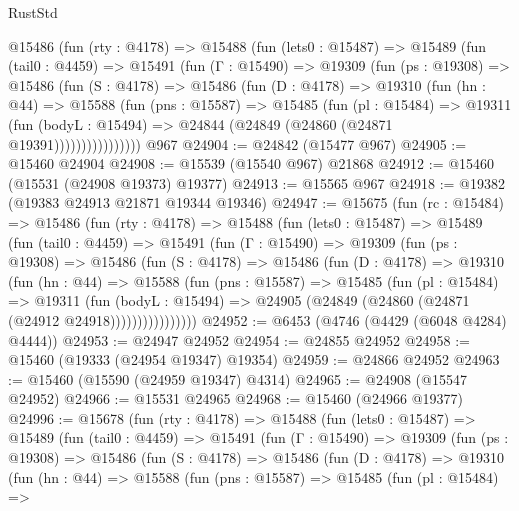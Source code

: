 \begin{lexlean}{RustStd}
\begin{coremodule}
      @15486
        (fun (rty : @4178) =>
        @15488
          (fun (lets0 : @15487) =>
          @15489
            (fun (tail0 : @4459) =>
            @15491
              (fun (Γ : @15490) =>
              @19309
                (fun (ps : @19308) =>
                @15486
                  (fun (S : @4178) =>
                  @15486
                    (fun (D : @4178) =>
                    @19310
                      (fun (hn : @44) =>
                      @15588
                        (fun (pns : @15587) =>
                        @15485
                          (fun (pl : @15484) =>
                          @19311
                            (fun (bodyL : @15494) =>
                            @24844 (@24849 (@24860 (@24871 @19391))))))))))))))))
    @967
@24904 := @24842 (@15477 @967)
@24905 := @15460 @24904
@24908 := @15539 (@15540 @967) @21868
@24912 := @15460 (@15531 (@24908 @19373) @19377)
@24913 := @15565 @967
@24918 := @19382 (@19383 @24913 @21871 @19344 @19346)
@24947 := @15675
    (fun (rc : @15484) =>
    @15486
      (fun (rty : @4178) =>
      @15488
        (fun (lets0 : @15487) =>
        @15489
          (fun (tail0 : @4459) =>
          @15491
            (fun (Γ : @15490) =>
            @19309
              (fun (ps : @19308) =>
              @15486
                (fun (S : @4178) =>
                @15486
                  (fun (D : @4178) =>
                  @19310
                    (fun (hn : @44) =>
                    @15588
                      (fun (pns : @15587) =>
                      @15485
                        (fun (pl : @15484) =>
                        @19311
                          (fun (bodyL : @15494) =>
                          @24905 (@24849 (@24860 (@24871 (@24912 @24918))))))))))))))))
@24952 := @6453 (@4746 (@4429 (@6048 @4284) @4444))
@24953 := @24947 @24952
@24954 := @24855 @24952
@24958 := @15460 (@19333 (@24954 @19347) @19354)
@24959 := @24866 @24952
@24963 := @15460 (@15590 (@24959 @19347) @4314)
@24965 := @24908 (@15547 @24952)
@24966 := @15531 @24965
@24968 := @15460 (@24966 @19377)
@24996 := @15678
    (fun (rty : @4178) =>
    @15488
      (fun (lets0 : @15487) =>
      @15489
        (fun (tail0 : @4459) =>
        @15491
          (fun (Γ : @15490) =>
          @19309
            (fun (ps : @19308) =>
            @15486
              (fun (S : @4178) =>
              @15486
                (fun (D : @4178) =>
                @19310
                  (fun (hn : @44) =>
                  @15588
                    (fun (pns : @15587) =>
                    @15485
                      (fun (pl : @15484) =>

\end{coremodule}
\end{lexlean}
